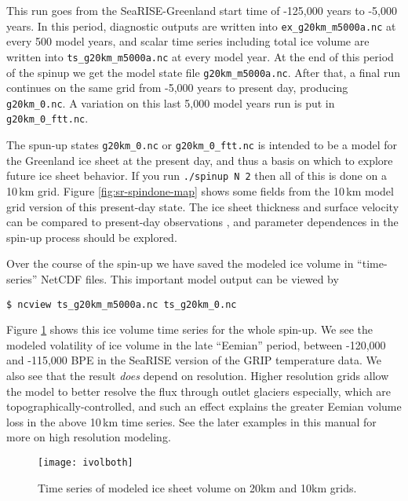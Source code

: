This run goes from the SeaRISE-Greenland start time of -125,000 years to -5,000 years.  In this period, diagnostic outputs are written into \texttt{ex_g20km_m5000a.nc} at every 500 model years, and scalar time series including total ice volume are written into \texttt{ts_g20km_m5000a.nc} at every model year.  At the end of this period of the spinup we get the model state file \texttt{g20km_m5000a.nc}.  After that, a final run continues on the same grid from -5,000 years to present day, producing \texttt{g20km_0.nc}.  A variation on this last 5,000 model years run is put in \texttt{g20km_0_ftt.nc}.



The spun-up states \texttt{g20km_0.nc} or \texttt{g20km_0_ftt.nc} is intended to be a model for the Greenland ice sheet at the present day, and thus a basis on which to explore future ice sheet behavior.  If you run \texttt{./spinup N 2} then all of this is done on a 10\,km grid.  Figure \ref{fig:sr-spindone-map} shows some fields from the 10\,km model grid version of this present-day state.  The ice sheet thickness and surface velocity can be compared to present-day observations \cite{BKAJS}, and parameter dependences in the spin-up process should be explored.

Over the course of the spin-up we have saved the modeled ice volume in ``time-series'' NetCDF files.  This important model output can be viewed by
\begin{verbatim}
$ ncview ts_g20km_m5000a.nc ts_g20km_0.nc
\end{verbatim}
\noindent Figure \ref{fig:sr-spindone-ivolboth} shows this ice volume time series for the whole spin-up.  We see the modeled volatility of ice volume in the late ``Eemian'' period, between -120,000 and -115,000 BPE in the SeaRISE version of the GRIP temperature data.  We also see that the result \emph{does} depend on resolution.  Higher resolution grids allow the model to better resolve the flux through outlet glaciers especially, which are topographically-controlled, and such an effect explains the greater Eemian volume loss in the above 10\,km time series.  See the later examples in this manual for more on high resolution modeling.

\begin{figure}[ht]
\centering
\texttt{[image: ivolboth]}
\caption{Time series of modeled ice sheet volume on 20km and 10km grids.}
\label{fig:sr-spindone-ivolboth}
\end{figure}

